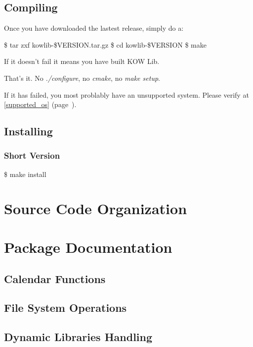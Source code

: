 \documentclass[english,letterpaper]{book}
\newcommand\Ref[1]{\textsection\ref{#1} (page~\pageref{#1})}
\begin{document}
\section{Compiling}
\label{getting_it:compiling}
Once you have downloaded the lastest release, simply do a:

\begin{bash}
\$ tar zxf kowlib-\${VERSION}.tar.gz
\$ cd kowlib-\${VERSION}
\$ make
\end{bash}

If it doesn't fail it means you have built KOW Lib. 

That's it. No \emph{./configure}, no \emph{cmake}, no \emph{make setup}.

If it has failed, you most problably have an unsupported system. Please verify
at \Ref{supported_os}.

\section{Installing}
\label{getting_it:installing}

\subsection{Short Version}

\begin{bash}
\$ make install
\end{bash}

\chapter{Source Code Organization}
\label{source_organization}

\chapter{Package Documentation}
\label{api}

\section{Calendar Functions}
\label{api:calendar}


\section{File System Operations}
\label{api:file_system}

\section{Dynamic Libraries Handling}
\label{api:libraries}
\end{document}
